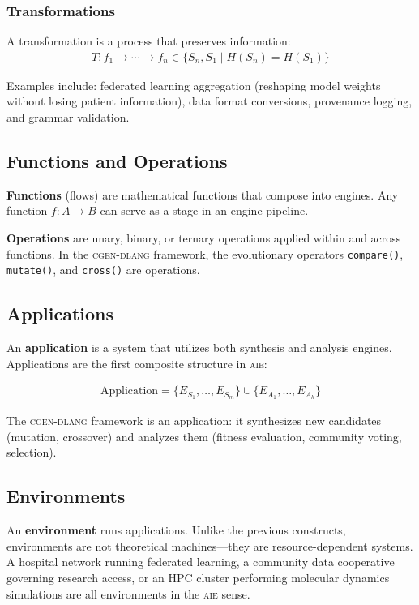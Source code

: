 \documentclass[11pt,letterpaper]{article}
\newcommand{\keyword}[1]{\textbf{\textcolor{accentpurple}{#1}}}
\newcommand{\aie}{\textsc{aie}}
\newcommand{\cgen}{\textsc{cgen-dlang}}
\begin{document}
\subsubsection{Transformations}

A transformation is a process that preserves information:
\begin{align}
    T : f_1 \rightarrow \cdots \rightarrow f_n \in \lbrace S_n, S_1 \mid H(S_n) = H(S_1) \rbrace
\end{align}

Examples include: federated learning aggregation (reshaping model weights without losing patient information), data format conversions, provenance logging, and grammar validation.

\subsection{Functions and Operations}

\keyword{Functions} (flows) are mathematical functions that compose into engines. Any function $f: A \rightarrow B$ can serve as a stage in an engine pipeline.

\keyword{Operations} are unary, binary, or ternary operations applied within and across functions. In the \cgen{} framework, the evolutionary operators \texttt{compare()}, \texttt{mutate()}, and \texttt{cross()} are operations.

\subsection{Applications}

An \keyword{application} is a system that utilizes both synthesis and analysis engines. Applications are the first composite structure in \aie{}:

\begin{align}
    \text{Application} = \lbrace E_{S_1}, \ldots, E_{S_m} \rbrace \cup \lbrace E_{A_1}, \ldots, E_{A_k} \rbrace
\end{align}

The \cgen{} framework is an application: it synthesizes new candidates (mutation, crossover) and analyzes them (fitness evaluation, community voting, selection).

\subsection{Environments}

An \keyword{environment} runs applications. Unlike the previous constructs, environments are not theoretical machines---they are resource-dependent systems. A hospital network running federated learning, a community data cooperative governing research access, or an HPC cluster performing molecular dynamics simulations are all environments in the \aie{} sense.
\end{document}
